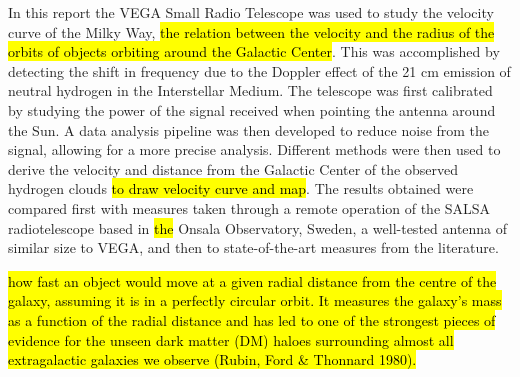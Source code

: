 In this report the VEGA Small Radio Telescope was used to study the velocity curve of the Milky Way, \hl{the relation between the velocity and the radius of the orbits of objects orbiting around the Galactic Center}.
This was accomplished by detecting the shift in frequency due to the Doppler effect of the 21 cm emission of neutral hydrogen in the Interstellar Medium.
The telescope was first calibrated by studying the power of the signal received when pointing the antenna around the Sun.
A data analysis pipeline was then developed to {reduce} noise from the signal, {allowing for a more precise analysis}.
Different methods were then used to derive the velocity and distance from the Galactic Center of the observed hydrogen clouds \hl{to draw velocity curve and map}.
The results obtained were compared first with measures taken through a remote operation of the SALSA radiotelescope based in \hl{the} Onsala Observatory, Sweden, a well-tested antenna of similar size to VEGA, and then to state-of-the-art measures from the literature.

\hl{how
fast an object would move at a given radial distance from the centre
of the galaxy, assuming it is in a perfectly circular orbit. It measures
the galaxy’s mass as a function of the radial distance and has led
to one of the strongest pieces of evidence for the unseen dark
matter (DM) haloes surrounding almost all extragalactic galaxies
we observe (Rubin, Ford \& Thonnard 1980).}

